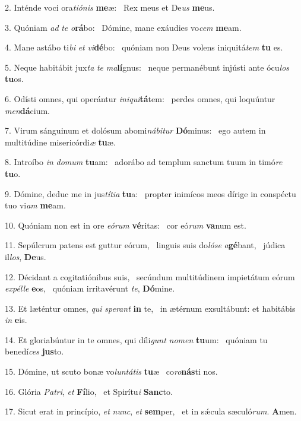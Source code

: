 2. Inténde voci ora\textit{ti}\textit{ó}\textit{nis} \textbf{me}æ: \ast\  Rex meus et De\textit{us} \textbf{me}us.\

3. Quóniam \textit{ad} \textit{te} \textit{o}\textbf{rá}bo: \ast\  Dómine, mane exáudies vo\textit{cem} \textbf{me}am.\

4. Mane astábo ti\textit{bi} \textit{et} \textit{vi}\textbf{dé}bo: \ast\  quóniam non Deus volens iniquitá\textit{tem} \textbf{tu} es.\

5. Neque habitábit jux\textit{ta} \textit{te} \textit{ma}\textbf{lí}gnus: \ast\  neque permanébunt injústi ante ócu\textit{los} \textbf{tu}os.\

6. Odísti omnes, qui operántur \textit{in}\textit{i}\textit{qui}\textbf{tá}tem: \ast\  perdes omnes, qui loquúntur \textit{men}\textbf{dá}cium.\

7. Virum sánguinum et dolósum abomi\textit{ná}\textit{bi}\textit{tur} \textbf{Dó}minus: \ast\  ego autem in multitúdine misericórdi\textit{æ} \textbf{tu}æ.\

8. Introíbo \textit{in} \textit{do}\textit{mum} \textbf{tu}am: \ast\  adorábo ad templum sanctum tuum in timó\textit{re} \textbf{tu}o.\

9. Dómine, deduc me in jus\textit{tí}\textit{ti}\textit{a} \textbf{tu}a: \ast\  propter inimícos meos dírige in conspéctu tuo vi\textit{am} \textbf{me}am.\

10. Quóniam non est in ore \textit{e}\textit{ó}\textit{rum} \textbf{vé}ritas: \ast\  cor eó\textit{rum} \textbf{va}num est.\

11. Sepúlcrum patens est guttur eórum, \dag\  linguis suis do\textit{ló}\textit{se} \textit{a}\textbf{gé}bant, \ast\  júdica il\textit{los}, \textbf{De}us.\

12. Décidant a cogitatiónibus suis, \dag\  secúndum multitúdinem impietátum eórum \textit{ex}\textit{pél}\textit{le} \textbf{e}os, \ast\  quóniam irritavérunt \textit{te}, \textbf{Dó}mine.\

13. Et læténtur omnes, \textit{qui} \textit{spe}\textit{rant} \textbf{in} te, \ast\  in ætérnum exsultábunt: et habitábis \textit{in} \textbf{e}is.\

14. Et gloriabúntur in te omnes, qui díli\textit{gunt} \textit{no}\textit{men} \textbf{tu}um: \ast\  quóniam tu benedí\textit{ces} \textbf{jus}to.\

15. Dómine, ut scuto bonæ vo\textit{lun}\textit{tá}\textit{tis} \textbf{tu}æ \ast\  co\textit{ro}\textbf{nás}ti nos.\

16. Glória \textit{Pa}\textit{tri}, \textit{et} \textbf{Fí}lio, \ast\  et Spirítu\textit{i} \textbf{Sanc}to.\

17. Sicut erat in princípio, \textit{et} \textit{nunc}, \textit{et} \textbf{sem}per, \ast\  et in sǽcula sæculó\textit{rum}. \textbf{A}men.\

